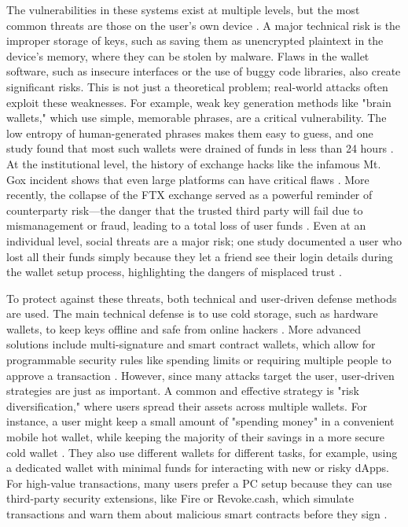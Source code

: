 The vulnerabilities in these systems exist at multiple levels, but the most common threats are those on the user's own device \cite{houy2023}. A major technical risk is the improper storage of keys, such as saving them as unencrypted plaintext in the device's memory, where they can be stolen by malware. Flaws in the wallet software, such as insecure interfaces or the use of buggy code libraries, also create significant risks. This is not just a theoretical problem; real-world attacks often exploit these weaknesses. For example, weak key generation methods like "brain wallets," which use simple, memorable phrases, are a critical vulnerability. The low entropy of human-generated phrases makes them easy to guess, and one study found that most such wallets were drained of funds in less than 24 hours \cite{houy2023}. At the institutional level, the history of exchange hacks like the infamous Mt. Gox incident shows that even large platforms can have critical flaws \cite{houy2023}. More recently, the collapse of the FTX exchange served as a powerful reminder of counterparty risk—the danger that the trusted third party will fail due to mismanagement or fraud, leading to a total loss of user funds \cite{yu2024}. Even at an individual level, social threats are a major risk; one study documented a user who lost all their funds simply because they let a friend see their login details during the wallet setup process, highlighting the dangers of misplaced trust \cite{yu2024}.

To protect against these threats, both technical and user-driven defense methods are used. The main technical defense is to use cold storage, such as hardware wallets, to keep keys offline and safe from online hackers \cite{suratkar2020}. More advanced solutions include multi-signature and smart contract wallets, which allow for programmable security rules like spending limits or requiring multiple people to approve a transaction \cite{yu2024}. However, since many attacks target the user, user-driven strategies are just as important. A common and effective strategy is "risk diversification," where users spread their assets across multiple wallets. For instance, a user might keep a small amount of "spending money" in a convenient mobile hot wallet, while keeping the majority of their savings in a more secure cold wallet \cite{yu2024}. They also use different wallets for different tasks, for example, using a dedicated wallet with minimal funds for interacting with new or risky dApps. For high-value transactions, many users prefer a PC setup because they can use third-party security extensions, like Fire or Revoke.cash, which simulate transactions and warn them about malicious smart contracts before they sign \cite{yu2024}.

